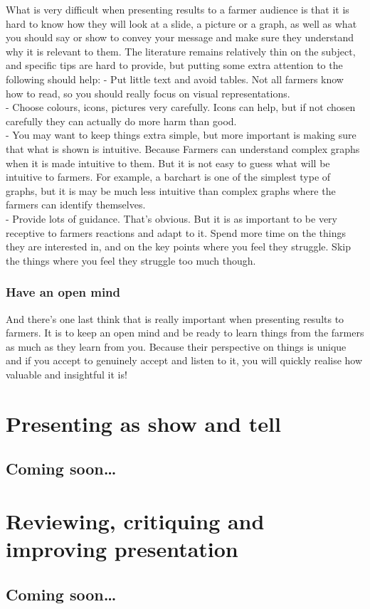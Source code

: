 \documentclass[
  titlepage]{book}
\begin{document}
What is very difficult when presenting results to a farmer audience is that it is hard to know how they will look at a slide, a picture or a graph, as well as what you should say or show to convey your message and make sure they understand why it is relevant to them. The literature remains relatively thin on the subject, and specific tips are hard to provide, but putting some extra attention to the following should help:
- Put little text and avoid tables. Not all farmers know how to read, so you should really focus on visual representations.\\
- Choose colours, icons, pictures very carefully. Icons can help, but if not chosen carefully they can actually do more harm than good.\\
- You may want to keep things extra simple, but more important is making sure that what is shown is intuitive. Because Farmers can understand complex graphs when it is made intuitive to them. But it is not easy to guess what will be intuitive to farmers. For example, a barchart is one of the simplest type of graphs, but it is may be much less intuitive than complex graphs where the farmers can identify themselves.\\
- Provide lots of guidance. That's obvious. But it is as important to be very receptive to farmers reactions and adapt to it. Spend more time on the things they are interested in, and on the key points where you feel they struggle. Skip the things where you feel they struggle too much though.

\hypertarget{have-an-open-mind}{%
\subsection{Have an open mind}\label{have-an-open-mind}}

And there's one last think that is really important when presenting results to farmers. It is to keep an open mind and be ready to learn things from the farmers as much as they learn from you. Because their perspective on things is unique and if you accept to genuinely accept and listen to it, you will quickly realise how valuable and insightful it is!

\hypertarget{show}{%
\chapter{Presenting as show and tell}\label{show}}

\hypertarget{coming-soon}{%
\section{Coming soon\ldots{}}\label{coming-soon}}

\hypertarget{review}{%
\chapter{Reviewing, critiquing and improving presentation}\label{review}}

\hypertarget{coming-soon-1}{%
\section{Coming soon\ldots{}}\label{coming-soon-1}}

  
\end{document}
